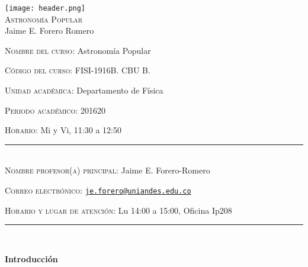 \documentclass[letterpaper,10pt,onecolumn]{article}
\begin{document}
\begin{center}

\texttt{[image: header.png]}\\[0.5cm]

\textsc{\LARGE Astronom\'ia Popular}\\[0.1cm]

\large Jaime E. Forero Romero\\[0.5cm]

\end{center}

\large \noindent\textsc{Nombre del curso:} Astronom\'ia Popular %
 
\noindent\textsc{C\'odigo del curso:} FISI-1916B. CBU B.


\noindent\textsc{Unidad acad\'emica:} Departamento de F\'isica 

\noindent\textsc{Periodo acad\'emico:} 201620 %

\noindent\textsc{Horario:} Mi y Vi, 11:30 a 12:50 %

\noindent\rule{\textwidth}{1pt}\\[-0.3cm]

\normalsize \noindent\textsc{Nombre profesor(a) principal:} Jaime
E. Forero-Romero %

\noindent\textsc{Correo electr\'onico:}
\href{mailto:je.forero@uniandes.edu.co}{\nolinkurl{je.forero@uniandes.edu.co}}

\noindent\textsc{Horario y lugar de atenci\'on:} Lu 14:00 a 15:00, Oficina Ip208 %
\\[-0.1cm]


\noindent\rule{\textwidth}{1pt}\\[-0.1cm]

\addtocounter{mysection}{1}

\noindent\textbf{\large {} \quad
  Introducci\'on}\\[-0.2cm] 

\end{document}
